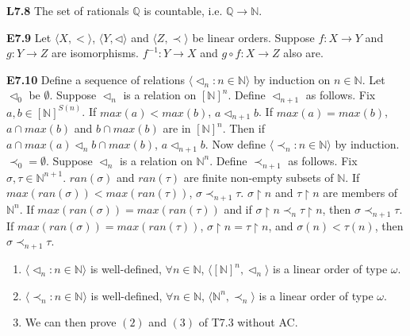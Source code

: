 \documentclass[10pt, landscape]{article}
\begin{document}
\begin{multicols*}{3}
\textbf{L7.8} The set of rationals $\mathbb{Q}$ is countable, i.e. $\mathbb{Q} \rightarrow \mathbb{N}$.

\textbf{E7.9} Let $\langle X, < \rangle$, $\langle Y, \lhd \rangle$ and $\langle Z, \prec \rangle$ be linear orders. Suppose $f: X \rightarrow Y$ and $g: Y \rightarrow Z$ are isomorphisms. $f^{-1} : Y \rightarrow X$ and $g \circ f : X \rightarrow Z $ also are.

\textbf{E7.10} Define a sequence of relations $\langle \lhd_n : n \in \mathbb{N} \rangle$ by induction on $n \in \mathbb{N}$. Let $\lhd_0$ be $\emptyset$. Suppose $\lhd_n$ is a relation on $[\mathbb{N}]^n$. Define $\lhd_{n+1}$ as follows. Fix $a, b \in [\mathbb{N}]^{S(n)}$. If $max(a) < max(b)$, $a \lhd_{n+1} b$. If $max(a) = max(b)$, $a \cap max(b)$ and $b \cap max(b)$ are in $[\mathbb{N}]^n$. Then if $a \cap max(a) \lhd_n b \cap max(b)$, $a \lhd_{n+1} b$. Now define $\langle \prec_n : n \in \mathbb{N} \rangle$ by induction. $\prec_0=\emptyset$. Suppose $\lhd_n$ is a relation on $\mathbb{N}^n$. Define $\prec_{n+1}$ as follows. Fix $\sigma, \tau \in \mathbb{N}^{n+1}$. $ran(\sigma)$ and $ran(\tau)$ are finite non-empty subsets of $\mathbb{N}$. If $max(ran(\sigma)) < max(ran(\tau))$, $\sigma \prec_{n+1} \tau$. $\sigma \restriction n$ and $\tau \restriction n$ are members of $\mathbb{N}^n$. If $max(ran(\sigma))=max(ran(\tau))$ and if $\sigma \restriction n \prec_n \tau \restriction n$, then $\sigma \prec_{n+1} \tau$. If $max(ran(\sigma))=max(ran(\tau))$, $\sigma \restriction n = \tau \restriction n$, and $\sigma(n) < \tau(n)$, then $\sigma \prec_{n+1} \tau$. 
\begin{enumerate}
    \item $\langle \lhd_n : n \in \mathbb{N} \rangle$ is well-defined, $\forall n \in \mathbb{N}$, $\langle [\mathbb{N}]^n, \lhd_n \rangle$ is a linear order of type $\omega$.
    \item $\langle \prec_n : n \in \mathbb{N} \rangle$ is well-defined, $\forall n \in \mathbb{N}$, $\langle \mathbb{N}^n, \prec_n \rangle$ is a linear order of type $\omega$.
    \item We can then prove $(2)$ and $(3)$ of T7.3 without AC.
\end{enumerate}


\end{multicols*}
\end{document}
